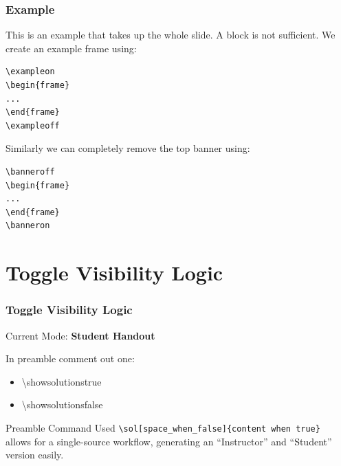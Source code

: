 \documentclass{ltx-talk}
\newif\ifshowsolutions
\newcommand{\sol}[2][1cm]{\ifshowsolutions #2 \else \vspace{#1} \fi}
\begin{document}
	\exampleon
	\begin{frame*}
		\frametitle{Example}
	This is an example that takes up the whole slide.  A block is not sufficient. We create an example frame using:
\begin{Verbatim}
\exampleon
\begin{frame}
...
\end{frame}
\exampleoff
\end{Verbatim}

\vspace{1cm}
	Similarly we can completely remove the top banner using:
\begin{Verbatim}
\banneroff
\begin{frame}
...
\end{frame}
\banneron
\end{Verbatim}
	\end{frame*}
	\exampleoff

\section{Toggle Visibility Logic}
	\begin{frame}
		\frametitle{Toggle Visibility Logic}
		
		Current Mode: \ifshowsolutions \textbf{Solutions Visible} \else \textbf{Student Handout} \fi
		
		In preamble comment out one:
		\begin{itemize}
			\item[] \textbackslash showsolutionstrue
			\item[] \textbackslash showsolutionsfalse
		\end{itemize}
		
		
		\sol[3cm]{
			\begin{align*}
				V\left(\hat\mu\right) &= V\left(\frac{1}{n}\sum_{i=1}^n Y_i\right)\\
				&= \frac{1}{n^2}\sum_{i=1}^n V(Y_i) = \frac{\sigma^2}{n}\\
				\Longrightarrow \mathrm{SE}\left(\hat\mu\right) &= \frac{\sigma}{\sqrt{n}}
			\end{align*}
		}
		
		\begin{block}{Preamble Command Used}
			\small
			\texttt{\textbackslash sol[space\_when\_false]\{content when true\}}\\ allows for a single-source workflow, generating an ``Instructor'' and ``Student'' version easily.
		\end{block}
	\end{frame}
	
\end{document}
